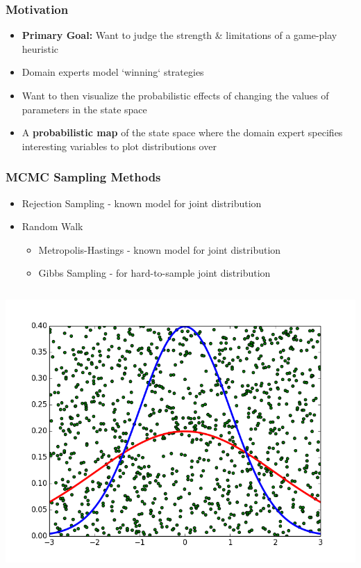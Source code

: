 
\begin{frame} \frametitle{Motivation}
\begin{itemize}
\item {\bf Primary Goal: } Want to judge the strength \& limitations of
      a game-play heuristic
\item Domain experts model `winning` strategies
\item Want to then visualize the probabilistic effects of changing the
      values of parameters in the state space
\item A {\bf probabilistic map} of the state space where the domain expert
      specifies interesting variables to plot distributions over
\end{itemize}
\end{frame}

\begin{frame} \frametitle{MCMC Sampling Methods}
\begin{itemize}
\item Rejection Sampling - known model for joint distribution
\item Random Walk
  \begin{itemize}
  \item Metropolis-Hastings - known model for joint distribution
  \item Gibbs Sampling - for hard-to-sample joint distribution
  \end{itemize}
\end{itemize}
\begin{columns}
  \includegraphics[width=\columnwidth]{rejection_sampling.png}

\end{columns}
\end{frame}
